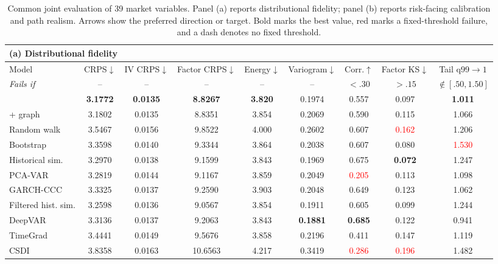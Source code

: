 \begin{table}[t]
\centering
\caption{Common joint evaluation of 39 market variables. Panel (a) reports distributional fidelity; panel (b) reports risk-facing calibration and path realism. Arrows show the preferred direction or target. Bold marks the best value, red marks a fixed-threshold failure, and a dash denotes no fixed threshold.}
\label{tab:baseline-comparison}
\label{tab:baseline-distributional}
\label{tab:baseline-risk}
\scriptsize
\setlength{\tabcolsep}{2.0pt}
\renewcommand{\arraystretch}{0.80}
\begin{tabular*}{\textwidth}{@{\extracolsep{\fill}}lcccccccc@{}}
\toprule
\multicolumn{9}{l}{\textbf{(a) Distributional fidelity}} \\
\midrule
Model & CRPS$\downarrow$ & IV CRPS$\downarrow$ & Factor CRPS$\downarrow$ & Energy$\downarrow$ & Variogram$\downarrow$ & Corr.$\uparrow$ & Factor KS$\downarrow$ & Tail q99$\to1$ \\
\textit{Fails if} & -- & -- & -- & -- & -- & $<.30$ & $>.15$ & $\notin[.50,1.50]$ \\
\midrule
\scenarioflow{} & \textbf{3.1772} & \textbf{0.0135} & \textbf{8.8267} & \textbf{3.820} & 0.1974 & 0.557 & 0.097 & \textbf{1.011} \\
\scenarioflow{} + graph & 3.1802 & 0.0135 & 8.8351 & 3.854 & 0.2069 & 0.590 & 0.115 & 1.066 \\
Random walk & 3.5467 & 0.0156 & 9.8522 & 4.000 & 0.2602 & 0.607 & \textcolor{red}{0.162} & 1.206 \\
Bootstrap & 3.3598 & 0.0140 & 9.3344 & 3.864 & 0.2038 & 0.607 & 0.080 & \textcolor{red}{1.530} \\
Historical sim. & 3.2970 & 0.0138 & 9.1599 & 3.843 & 0.1969 & 0.675 & \textbf{0.072} & 1.247 \\
PCA-VAR & 3.2819 & 0.0144 & 9.1167 & 3.859 & 0.2049 & \textcolor{red}{0.205} & 0.113 & 1.098 \\
GARCH-CCC & 3.3325 & 0.0137 & 9.2590 & 3.903 & 0.2048 & 0.649 & 0.123 & 1.062 \\
Filtered hist. sim. & 3.2598 & 0.0136 & 9.0567 & 3.854 & 0.1911 & 0.605 & 0.099 & 1.244 \\
DeepVAR & 3.3136 & 0.0137 & 9.2063 & 3.843 & \textbf{0.1881} & \textbf{0.685} & 0.122 & 0.941 \\
TimeGrad & 3.4441 & 0.0149 & 9.5676 & 3.858 & 0.2196 & 0.411 & 0.147 & 1.119 \\
CSDI & 3.8358 & 0.0163 & 10.6563 & 4.217 & 0.3419 & \textcolor{red}{0.286} & \textcolor{red}{0.196} & 1.482 \\
\bottomrule
\end{tabular*}


\end{table}
